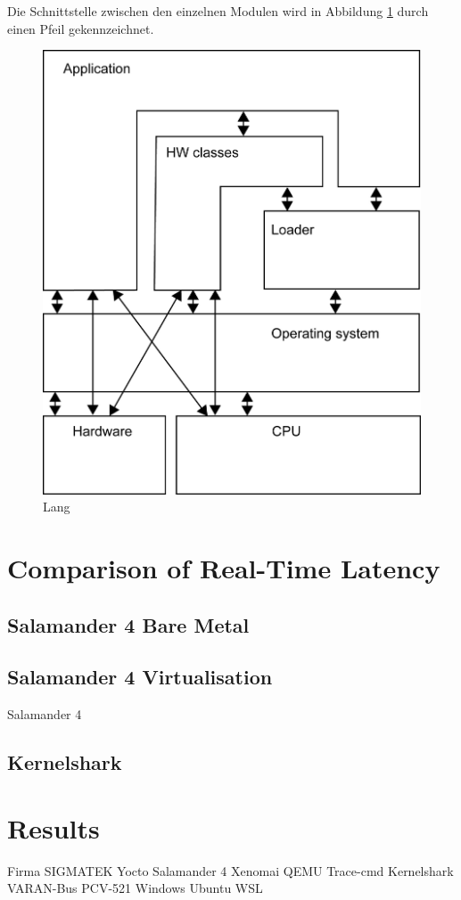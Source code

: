 \documentclass[MMR,Master,english]{twbook}
\begin{document}
  Die Schnittstelle zwischen den einzelnen Modulen wird in Abbildung \ref{fig:lasal_cpu} durch einen Pfeil gekennzeichnet.

  \begin{figure}[!h]
    \centering
    \includegraphics[width=0.5\columnwidth]{img/Software-Struktur einer LASAL CPU.png}
    \caption[Kurz]{Lang}
    \label{fig:lasal_cpu}
  \end{figure}

\clearpage


\chapter{Comparison of Real-Time Latency}

\section{Salamander 4 Bare Metal}




\section{Salamander 4 Virtualisation}




Salamander 4 





\section{Kernelshark}




\chapter{Results}
Firma SIGMATEK\newline
Yocto\newline
Salamander 4\newline
Xenomai\newline
QEMU\newline
Trace-cmd\newline
Kernelshark\newline
VARAN-Bus PCV-521\newline
Windows\newline
Ubuntu\newline
WSL\newline
\clearpage
\end{document}
